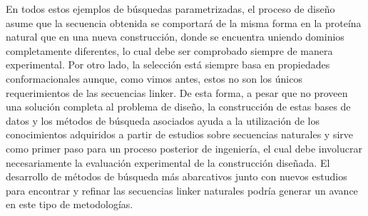 En todos estos ejemplos de búsquedas parametrizadas, el proceso de diseño asume que la secuencia 
obtenida se comportará de la misma forma en la proteína natural que en una nueva construcción, donde se encuentra uniendo dominios completamente diferentes, lo cual debe ser comprobado siempre de manera experimental.
Por otro lado, la selección está siempre basa en propiedades conformacionales aunque, como vimos antes, estos no son los únicos requerimientos de las secuencias linker.
De esta forma, a pesar que no proveen una solución completa al problema de diseño, la construcción de estas bases de datos y los métodos de búsqueda asociados 
ayuda a la utilización de los conocimientos adquiridos a partir de estudios sobre secuencias naturales y sirve como primer paso para un proceso posterior de ingeniería, 
el cual debe involucrar necesariamente la evaluación experimental de la construcción diseñada.
El desarrollo de métodos de búsqueda más abarcativos junto con nuevos estudios para encontrar y refinar las secuencias linker naturales podría generar un avance en este tipo de metodologías.








































